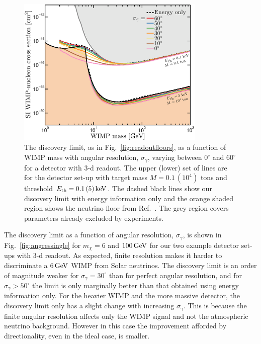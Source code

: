 \begin{figure}
\begin{center}
\includegraphics[width=0.8\textwidth,angle=0]{Figures/AngRes_floors.eps}
\caption[Neutrino floor as a function of angular resolution]{The discovery limit, as in Fig.~\ref{fig:readoutfloors}, as a function of WIMP mass with angular resolution, $\sigma_\gamma$, varying between $0^{\circ}$ and $60^{\circ}$ for a detector with 3-d readout. 
The upper (lower) set of lines are for the detector set-up with target mass $M=0.1 \, (10^4)$ tons and threshold $E_{\rm th} = 0.1 \, (5) \, {\rm keV}$.  
The dashed black lines show our discovery limit with energy information only and
the orange shaded region shows the neutrino floor from Ref.~\cite{Ruppin:2014bra}. The grey region covers parameters already excluded by experiments.
} 
\label{fig:angresfloors}
\end{center}
\end{figure} 

The discovery limit as a function of angular resolution, $\sigma_\gamma$, is shown in Fig.~\ref{fig:angressingle} for
$m_{\chi} = 6$ and $100 \, {\rm GeV} $ for our two example detector set-ups with 3-d readout. As expected,  finite resolution makes it harder to discriminate a $6 \, {\rm GeV}$ WIMP from Solar neutrinos. The discovery limit is an order of magnitude weaker for $\sigma_{\gamma} = 30^{\circ}$ than for perfect angular resolution, and for $\sigma_{\gamma} > 50^{\circ}$ the limit is only marginally better than that obtained using energy information only. For the heavier WIMP and the more massive detector, the discovery limit only has a slight change with increasing $\sigma_\gamma$. This is because the finite angular resolution affects only the WIMP signal and not the atmospheric neutrino background. However in this case the improvement afforded by directionality, even in the ideal case, is smaller.

